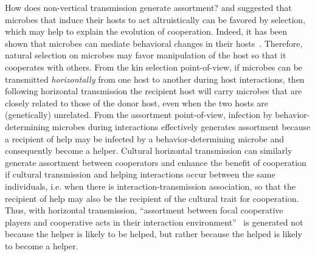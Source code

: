 \documentclass[12pt]{extarticle}
\newcommand{\beginsupplement}{%
      	\setcounter{table}{0}
        \renewcommand{\thetable}{S\arabic{table}}%
        \setcounter{figure}{0}
        \renewcommand{\thefigure}{S\arabic{figure}}%
		\setcounter{equation}{0}
        \renewcommand{\theequation}{A\arabic{equation}}%
}
\begin{document}
How does non-vertical transmission generate assortment? 
\citet{lewin2017microbes} and \citet{lewin2020rockpaperscissors} 
suggested that microbes that induce their hosts to act altruistically can be favored by selection, which may help to explain the evolution of cooperation. 
Indeed, it has been shown that microbes can mediate behavioral changes in their  hosts~\citep{dobson1988population,poulin2010parasite}. 
Therefore, natural selection on microbes may favor manipulation of the host so that it cooperates with others.
From the kin selection point-of-view, if microbes can be transmitted \emph{horizontally} from one host to another during host interactions, then following horizontal transmission the recipient host will carry microbes that are closely related to those of the donor host, 
even when the two hosts are (genetically) unrelated. 
From the assortment point-of-view,
infection by behavior-determining microbes during interactions effectively generates assortment because a recipient of help may be infected by a behavior-determining microbe and consequently become a helper.
Cultural horizontal transmission can similarly generate assortment between cooperators and enhance the benefit of cooperation if cultural transmission and helping interactions occur between the same individuals, i.e. when there is interaction-transmission association, so that the recipient of help may also be the recipient of the cultural trait for cooperation. 
Thus, with horizontal transmission, ``assortment between focal cooperative players and cooperative acts in their interaction
environment''~\citep{Fletcher2009assortment} is generated not because the helper is likely to be helped, but rather because the helped is likely to become a helper.

\newpage
\begingroup
 
 \linespread{1}\selectfont
 \setlength{\bibsep}{2pt}
 
\endgroup





\newpage
\beginsupplement %
\end{document}
